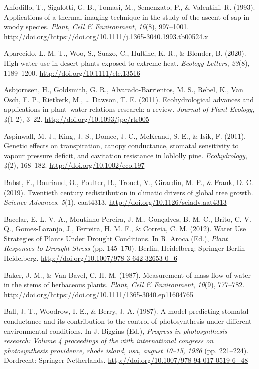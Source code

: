 \documentclass[11pt,twoside]{reedthesis}
\begin{document}
\hypertarget{ref-Anfodillo1993}{}
Anfodillo, T., Sigalotti, G. B., Tomasi, M., Semenzato, P., \&
Valentini, R. (1993). Applications of a thermal imaging technique in the
study of the ascent of sap in woody species. \emph{Plant, Cell \&
Environment}, \emph{16}(8), 997--1001.
\url{http://doi.org/https://doi.org/10.1111/j.1365-3040.1993.tb00524.x}

\hypertarget{ref-aparecido_high_2020}{}
Aparecido, L. M. T., Woo, S., Suazo, C., Hultine, K. R., \& Blonder, B.
(2020). High water use in desert plants exposed to extreme heat.
\emph{Ecology Letters}, \emph{23}(8), 1189--1200.
\url{http://doi.org/10.1111/ele.13516}

\hypertarget{ref-Asbjornsen2011}{}
Asbjornsen, H., Goldsmith, G. R., Alvarado-Barrientos, M. S., Rebel, K.,
Van Osch, F. P., Rietkerk, M., \ldots{} Dawson, T. E. (2011).
Ecohydrological advances and applications in plant--water relations
research: a review. \emph{Journal of Plant Ecology}, \emph{4}(1-2),
3--22. \url{http://doi.org/10.1093/jpe/rtr005}

\hypertarget{ref-aspinwall_genetic_2011}{}
Aspinwall, M. J., King, J. S., Domec, J.-C., McKeand, S. E., \& Isik, F.
(2011). Genetic effects on transpiration, canopy conductance, stomatal
sensitivity to vapour pressure deficit, and cavitation resistance in
loblolly pine. \emph{Ecohydrology}, \emph{4}(2), 168--182.
\url{http://doi.org/10.1002/eco.197}

\hypertarget{ref-babst_twentieth_2019}{}
Babst, F., Bouriaud, O., Poulter, B., Trouet, V., Girardin, M. P., \&
Frank, D. C. (2019). Twentieth century redistribution in climatic
drivers of global tree growth. \emph{Science Advances}, \emph{5}(1),
eaat4313. \url{http://doi.org/10.1126/sciadv.aat4313}

\hypertarget{ref-Bacelar2012}{}
Bacelar, E. L. V. A., Moutinho-Pereira, J. M., Gonçalves, B. M. C.,
Brito, C. V. Q., Gomes-Laranjo, J., Ferreira, H. M. F., \& Correia, C.
M. (2012). Water Use Strategies of Plants Under Drought Conditions. In
R. Aroca (Ed.), \emph{Plant Responses to Drought Stress} (pp. 145--170).
Berlin, Heidelberg: Springer Berlin Heidelberg.
\url{http://doi.org/10.1007/978-3-642-32653-0_6}

\hypertarget{ref-Baker1987}{}
Baker, J. M., \& Van Bavel, C. H. M. (1987). Measurement of mass flow of
water in the stems of herbaceous plants. \emph{Plant, Cell \&
Environment}, \emph{10}(9), 777--782.
\url{http://doi.org/https://doi.org/10.1111/1365-3040.ep11604765}

\hypertarget{ref-Ball1987}{}
Ball, J. T., Woodrow, I. E., \& Berry, J. A. (1987). A model predicting
stomatal conductance and its contribution to the control of
photosynthesis under different environmental conditions. In J. Biggins
(Ed.), \emph{Progress in photosynthesis research: Volume 4 proceedings
of the viith international congress on photosynthesis providence, rhode
island, usa, august 10--15, 1986} (pp. 221--224). Dordrecht: Springer
Netherlands. \url{http://doi.org/10.1007/978-94-017-0519-6_48}
\end{document}
